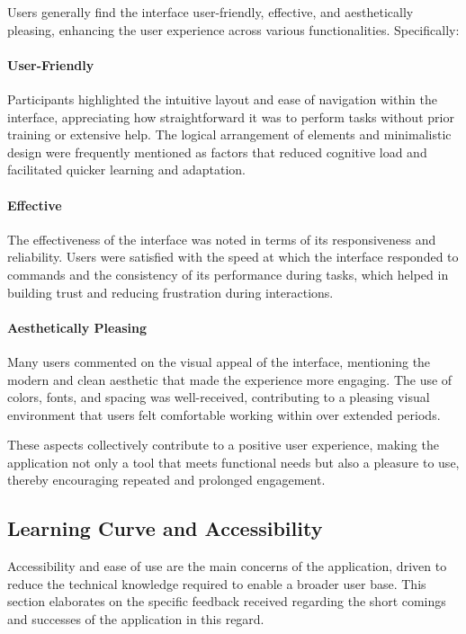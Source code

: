 Users generally find the interface user-friendly, effective, and aesthetically pleasing, enhancing the user experience across various functionalities. Specifically:

\paragraph{User-Friendly} 
Participants highlighted the intuitive layout and ease of navigation within the interface, appreciating how straightforward it was to perform tasks without prior training or extensive help. 
The logical arrangement of elements and minimalistic design were frequently mentioned as factors that reduced cognitive load and facilitated quicker learning and adaptation.
 
\paragraph{Effective} 
The effectiveness of the interface was noted in terms of its responsiveness and reliability. 
Users were satisfied with the speed at which the interface responded to commands and the consistency of its performance during tasks, which helped in building trust and reducing frustration during interactions.
 
\paragraph{Aesthetically Pleasing} 
Many users commented on the visual appeal of the interface, mentioning the modern and clean aesthetic that made the experience more engaging. 
The use of colors, fonts, and spacing was well-received, contributing to a pleasing visual environment that users felt comfortable working within over extended periods.

These aspects collectively contribute to a positive user experience, making the application not only a tool that meets functional needs but also a pleasure to use, thereby encouraging repeated and prolonged engagement.

\subsection*{Learning Curve and Accessibility}
\label{sec:results:learning_curve_accessibility}

Accessibility and ease of use are the main concerns of the application, driven to reduce the technical knowledge required to enable a broader user base.
This section elaborates on the specific feedback received regarding the short comings and successes of the application in this regard.

